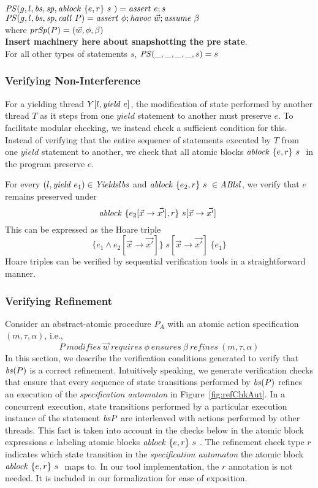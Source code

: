 $\mathit{PS}(g, l, \mathit{bs}, \mathit{sp}, \mathit{ablock}\ {\{e,r\}}\ {s}\ ) =  \mathit{assert}\ e; s$\\
$\mathit{PS}(g, l, \mathit{bs}, \mathit{sp}, \mathit{call}\ P) =  \mathit{assert}\ \phi; \mathit{havoc}\ \vec{w}; \mathit{assume}\ \beta$\\
where $\mathit{prSp}(P) = (\vec{w}, \phi, \beta)$\\
{\bf Insert machinery here about snapshotting the pre state}.\\
For all other types of statements $s$, $\mathit{PS}(\_, \_, \_, \_,s) =  s$\\

\subsubsection{Verifying Non-Interference}
For a yielding thread $Y[l, \mathit{yield}\ e]$, the modification of state performed by another thread $T$ as it steps from one $yield$ statement to another must preserve $e$. To facilitate modular checking, we instead check a sufficient condition for this. Instead of verifying that the entire sequence of statements executed by $T$ from one $yield$ statement to another, we check that all atomic blocks $\mathit{ablock}\ {\{e,r\}}\ {s}\ $ in the program preserve $e$.

For every $(l,\mathit{yield}\ e_1) \in \mathit{Yields} l \mathit{bs}$ and $\mathit{ablock}\ {\{e_2,r\}}\ {s}\  \in \mathit{ABls} l$, we verify that $e$ remains preserved under 
$$\mathit{ablock}\ {\{e_2[\vec{x} \rightarrow \vec{x'}],  r\}}\ {s[\vec{x} \rightarrow \vec{x'}]}\ $$
This can be expressed as the Hoare triple 
$$\{ e_1 \wedge e_2[\vec{x} \rightarrow \vec{x'}] \} \; s[\vec{x} \rightarrow \vec{x'}] \; \{ e_1 \}$$
Hoare triples can be verified by sequential verification tools in a straightforward manner. 

\subsubsection{Verifying Refinement}
Consider an abstract-atomic procedure $P_{A}$ with an atomic action specification $(m, \tau, \alpha)$, i.e., $$P\ \mathit{modifies}\ \overrightarrow{w}\ \mathit{requires}\ \phi\ \mathit{ensures}\ \beta\ \mathit{refines}\ (m, \tau, \alpha)$$
In this section, we describe the verification conditions generated to verify that $\mathit{bs}(P)$ is a correct refinement. Intuitively speaking, we generate verification checks that ensure that every sequence of state transitions performed by $\mathit{bs}(P)$ refines an execution of the {\em specification automaton} in Figure~\ref{fig:refChkAut}. In a concurrent execution, state transitions performed by a particular execution instance of the statement $\mathit{bs}{P}$ are interleaved with actions performed by other threads. This fact is taken into account in the checks below in the atomic block expressions $e$ labeling atomic blocks $\mathit{ablock}\ {\{e,r\}}\ {s}\ $. The refinement check type $r$ indicates which state transition in the {\em specification automaton} the atomic block $\mathit{ablock}\ {\{e,r\}}\ {s}\ $ maps to. In our tool implementation, the $r$ annotation is not needed. It is included in our formalization for ease of exposition. 


